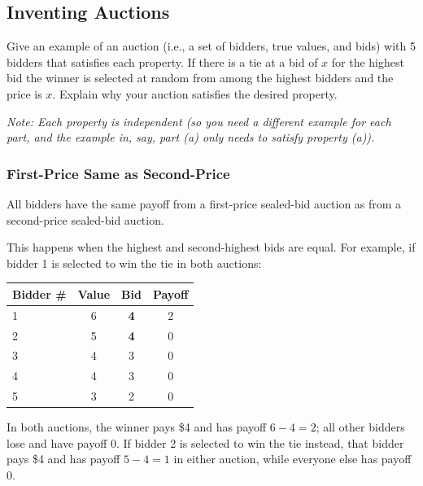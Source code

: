 \documentclass[newpages, arabicsubsec]{assignment}
\begin{document}
\subsection{Inventing Auctions}

\begin{problem}
Give an example of an auction (i.e., a set of bidders, true values, and bids) with 5 bidders that satisfies each property. If there is a tie at a bid of \(x\) for the highest bid the winner is selected at random from among the highest bidders and the price is \(x\). Explain why your auction satisfies the desired property.

\textit{Note: Each property is independent (so you need a different example for each part, and the example in, say, part (a) only needs to satisfy property (a)).}
\end{problem}

\subsubsection{First-Price Same as Second-Price}

\begin{problem}
All bidders have the same payoff from a first-price sealed-bid auction as from a second-price sealed-bid auction.
\end{problem}
\begin{solution}
    This happens when the highest and second-highest bids are equal. For example, if bidder 1 is selected to win the tie in both auctions:

    \begin{table}[h]
        \centering
        \begin{tabular}{lccc}
            \toprule
            Bidder \# & Value & Bid        & Payoff \\
            \midrule
            1         & 6     & \textbf{4} & 2      \\
            2         & 5     & \textbf{4} & 0      \\
            3         & 4     & 3          & 0      \\
            4         & 4     & 3          & 0      \\
            5         & 3     & 2          & 0      \\
            \bottomrule
        \end{tabular}
    \end{table}

    In both auctions, the winner pays \$4 and has payoff \(6-4=2\); all other bidders lose and have payoff 0. If bidder 2 is selected to win the tie instead, that bidder pays \$4 and has payoff \(5-4=1\) in either auction, while everyone else has payoff 0.
\end{solution}
\end{document}
